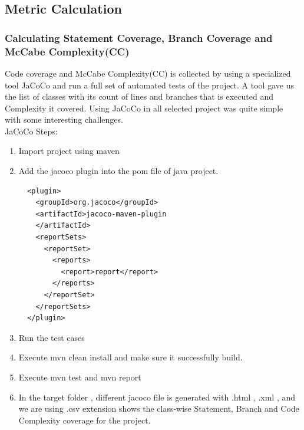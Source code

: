 \documentclass[letterpaper, 12 pt, conference]{ieeetran}  %
\begin{document}
\subsection{Metric Calculation}
\medskip
\subsubsection{ Calculating Statement Coverage, Branch Coverage and McCabe Complexity(CC) }
Code coverage and McCabe Complexity(CC) is collected by using a specialized tool JaCoCo and run a full set of automated tests of the project. A tool gave us the list of classes with its count of lines and branches that is executed and Complexity it covered. Using JaCoCo in all selected project was quite simple with some interesting challenges.
\\JaCoCo Steps:\cite{jacocoplugin}
    \begin{enumerate}[i]
      \item Import project using maven
      \item Add  the jacoco plugin into the pom file of java project.
\begin{verbatim} 
  <plugin>
    <groupId>org.jacoco</groupId>
    <artifactId>jacoco-maven-plugin
    </artifactId>
    <reportSets>
      <reportSet>
        <reports>
          <report>report</report>
        </reports>
      </reportSet>
    </reportSets>
  </plugin>
\end{verbatim}
      \item Run the test cases
      \item Execute mvn clean install and make sure it successfully build.
      \item Execute mvn test and mvn report
      \item In the target folder , different jacoco file is generated with .html , .xml , and we are using .csv extension shows the class-wise Statement, Branch and Code Complexity coverage for the project.
    \end{enumerate}
\smallskip
\end{document}
